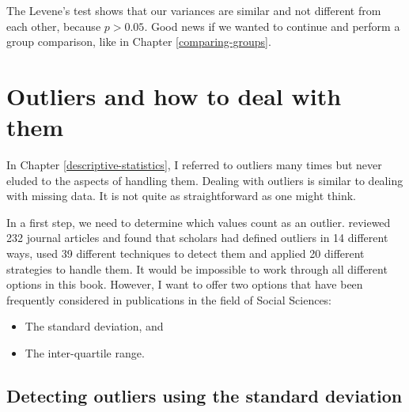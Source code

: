\documentclass[
]{book}
\newenvironment{Shaded}{\begin{snugshade}}{\end{snugshade}}
\newcommand{\DocumentationTok}[1]{\textcolor[rgb]{0.56,0.35,0.01}{\textbf{\textit{#1}}}}
\newcommand{\FunctionTok}[1]{\textcolor[rgb]{0.00,0.00,0.00}{#1}}
\newcommand{\NormalTok}[1]{#1}
\newcommand{\SpecialCharTok}[1]{\textcolor[rgb]{0.00,0.00,0.00}{#1}}
\begin{document}
\begin{Shaded}
\end{Shaded}

The Levene's test shows that our variances are similar and not different from each other, because \(p > 0.05\). Good news if we wanted to continue and perform a group comparison, like in Chapter \ref{comparing-groups}.

\hypertarget{dealing-with-outliers}{%
\section{Outliers and how to deal with them}\label{dealing-with-outliers}}

In Chapter \ref{descriptive-statistics}, I referred to outliers many times but never eluded to the aspects of handling them. Dealing with outliers is similar to dealing with missing data. It is not quite as straightforward as one might think.

In a first step, we need to determine which values count as an outlier. \citet{aguinis2013best} reviewed 232 journal articles and found that scholars had defined outliers in 14 different ways, used 39 different techniques to detect them and applied 20 different strategies to handle them. It would be impossible to work through all different options in this book. However, I want to offer two options that have been frequently considered in publications in the field of Social Sciences:

\begin{itemize}
\item
  The standard deviation, and
\item
  The inter-quartile range.
\end{itemize}

\hypertarget{ouliers-standard_deviation}{%
\subsection{Detecting outliers using the standard deviation}\label{ouliers-standard_deviation}}
\end{document}
